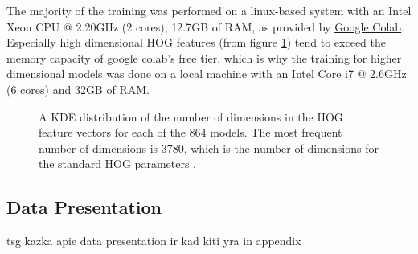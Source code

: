 The majority of the training was performed on a linux-based system with an Intel Xeon CPU @ 2.20GHz (2 cores), 12.7GB of RAM, as provided by \href{https://colab.research.google.com/}{Google Colab}. Especially high dimensional HOG features (from figure \ref{fig:dimension_distribution}) tend to exceed the memory capacity of google colab's free tier, which is why the training for higher dimensional models was done on a local machine with an Intel Core i7 @ 2.6GHz (6 cores) and 32GB of RAM.

\begin{figure}
    
    \caption{A KDE distribution of the number of dimensions in the HOG feature vectors for each of the 864 models. The most frequent number of dimensions is 3780, which is the number of dimensions for the standard HOG parameters \cite{dalal_2005_histograms}.}
    \label{fig:dimension_distribution}
\end{figure}

\subsection{Data Presentation}

tsg kazka apie data presentation ir kad kiti yra in appendix



